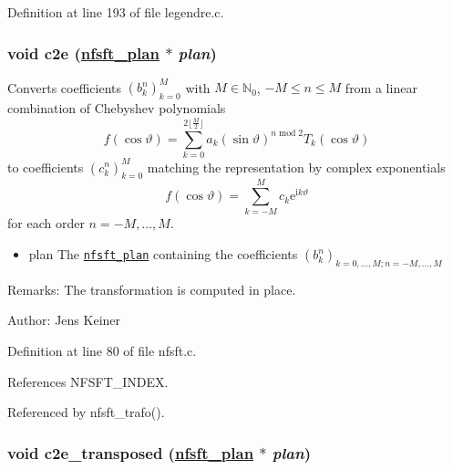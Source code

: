 Definition at line 193 of file legendre.c.\hypertarget{group__nfsft_ga23}{
\subsubsection[c2e]{\setlength{\rightskip}{0pt plus 5cm}void c2e (\hyperlink{structnfsft__plan}{nfsft\_\-plan} $\ast$ {\em plan})}}
\label{group__nfsft_ga23}


Converts coefficients $\left(b_k^n\right)_{k=0}^M$ with $M \in \mathbb{N}_0$, $-M \le n \le M$ from a linear combination of Chebyshev polynomials \[ f(\cos\vartheta) = \sum_{k=0}^{2\lfloor\frac{M}{2}\rfloor} a_k (\sin\vartheta)^{n\;\mathrm{mod}\;2} T_k(\cos\vartheta) \] to coefficients $\left(c_k^n\right)_{k=0}^M$ matching the representation by complex exponentials \[ f(\cos\vartheta) = \sum_{k=-M}^{M} c_k \mathrm{e}^{\mathrm{i}k\vartheta} \] for each order $n=-M,\ldots,M$. 

\begin{itemize}
\item plan The {\tt \hyperlink{structnfsft__plan}{nfsft\_\-plan}} containing the coefficients $\left(b_k^n\right)_{k=0,\ldots,M;n=-M,\ldots,M}$\end{itemize}
\begin{Desc}
\item[Remarks:]The transformation is computed in place.\end{Desc}
\begin{Desc}
\item[Author:]Jens Keiner \end{Desc}


Definition at line 80 of file nfsft.c.

References NFSFT\_\-INDEX.

Referenced by nfsft\_\-trafo().\hypertarget{group__nfsft_ga24}{
\subsubsection[c2e\_\-transposed]{\setlength{\rightskip}{0pt plus 5cm}void c2e\_\-transposed (\hyperlink{structnfsft__plan}{nfsft\_\-plan} $\ast$ {\em plan})}}
\label{group__nfsft_ga24}


